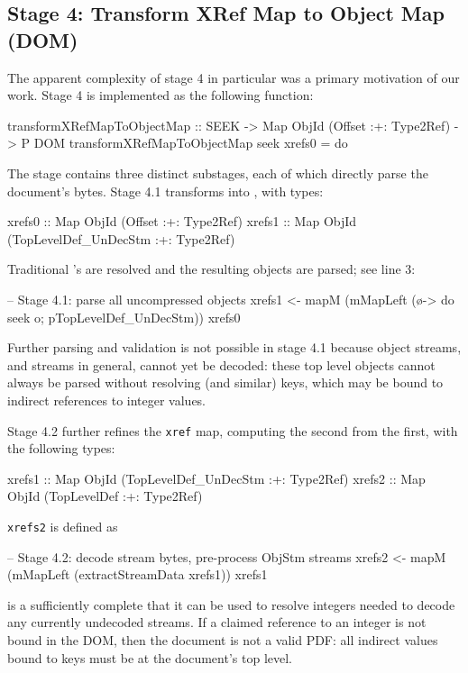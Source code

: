 \subsection{Stage 4: Transform XRef Map to Object Map (DOM)}
\label{sec:stage-4}
%
The apparent complexity of stage 4 in particular was a primary motivation of our work.
%
Stage 4 is implemented as the following function:
\begin{code}
transformXRefMapToObjectMap
  :: SEEK -> Map ObjId (Offset :+: Type2Ref) -> P DOM
transformXRefMapToObjectMap seek xrefs0 = do
\end{code}
%
The stage contains three distinct substages, each of which directly parse the document's bytes.
%
Stage 4.1 transforms  into , with types:
\begin{codeNoExecute}
  xrefs0 :: Map ObjId (Offset               :+: Type2Ref) 
  xrefs1 :: Map ObjId (TopLevelDef_UnDecStm :+: Type2Ref)
\end{codeNoExecute}
%
Traditional 's are resolved and the resulting objects are parsed; see line 3:
\begin{code}
    -- Stage 4.1: parse all uncompressed objects
    xrefs1 <- mapM
                (mMapLeft (\o-> do {seek o; pTopLevelDef_UnDecStm}))
                xrefs0
\end{code}
Further parsing and validation is not possible in stage 4.1 because object streams, and streams in general, cannot yet be decoded: these top level objects cannot always be parsed without resolving  (and similar) keys, which may be bound to indirect references to integer values.

Stage 4.2 further refines the \texttt{xref} map, computing the second from the first, with the following types:
\begin{codeNoExecute}
  xrefs1 :: Map ObjId (TopLevelDef_UnDecStm :+: Type2Ref)
  xrefs2 :: Map ObjId (TopLevelDef          :+: Type2Ref) 
\end{codeNoExecute}
\texttt{xrefs2} is defined as
\begin{code}
    -- Stage 4.2: decode stream bytes, pre-process ObjStm streams
    xrefs2 <- mapM
                (mMapLeft (extractStreamData xrefs1))
                xrefs1
\end{code}
%
 is a sufficiently complete  that it can be used to resolve integers needed to decode any currently undecoded streams.
%
If a claimed reference to an integer is not bound in the DOM, then the document is not a valid PDF: all indirect values bound to  keys must be at the document's top level.

